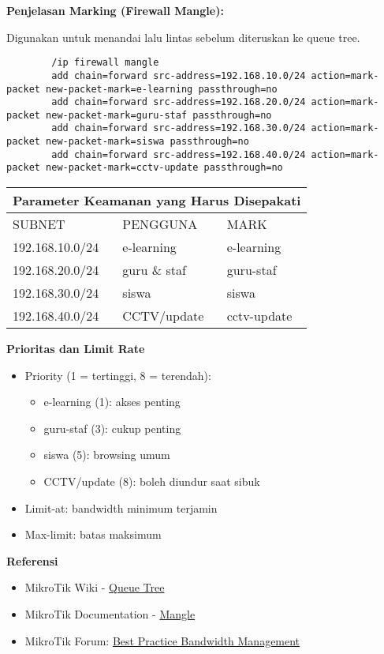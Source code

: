 \begin{enumerate}
	\textbf{Penjelasan Marking (Firewall Mangle):}

	Digunakan untuk menandai lalu lintas sebelum diteruskan ke queue tree.
	\begin{lstlisting}
		/ip firewall mangle
		add chain=forward src-address=192.168.10.0/24 action=mark-packet new-packet-mark=e-learning passthrough=no
		add chain=forward src-address=192.168.20.0/24 action=mark-packet new-packet-mark=guru-staf passthrough=no
		add chain=forward src-address=192.168.30.0/24 action=mark-packet new-packet-mark=siswa passthrough=no
		add chain=forward src-address=192.168.40.0/24 action=mark-packet new-packet-mark=cctv-update passthrough=no
	\end{lstlisting}

	\begin{center}
		\begin{tabular}{ |p{3cm}||p{3cm}||p{3cm}| }
			\hline
			\multicolumn{3}{|c|}{Parameter Keamanan yang Harus Disepakati} \\
			\hline
			SUBNET & PENGGUNA & MARK \\
			\hline
			192.168.10.0/24	 & e-learning	& e-learning \\
			192.168.20.0/24	 & guru \& staf	& guru-staf \\
			192.168.30.0/24	 & siswa 		& siswa \\
			192.168.40.0/24	 & CCTV/update	& cctv-update \\
			\hline
		\end{tabular}
	\end{center}

	\textbf{Prioritas dan Limit Rate}
	\begin{itemize}
		\item Priority (1 = tertinggi, 8 = terendah):
		\begin{itemize}
			\item e-learning (1): akses penting
			\item guru-staf (3): cukup penting
			\item siswa (5): browsing umum
			\item CCTV/update (8): boleh diundur saat sibuk
		\end{itemize}
		\item Limit-at: bandwidth minimum terjamin
		\item Max-limit: batas maksimum \newline
	\end{itemize} 

	\textbf{Referensi}
	\begin{itemize}
	\item MikroTik Wiki - \href{https://wiki.mikrotik.com/wiki/Manual:Queue}{Queue Tree}
	\item MikroTik Documentation - \href{https://wiki.mikrotik.com/wiki/Manual:IP/Firewall/Mangle}{Mangle}
	\item MikroTik Forum: \href{https://forum.mikrotik.com/viewtopic.php?t=133621}{Best Practice Bandwidth Management}		
	\end{itemize}

\end{enumerate}